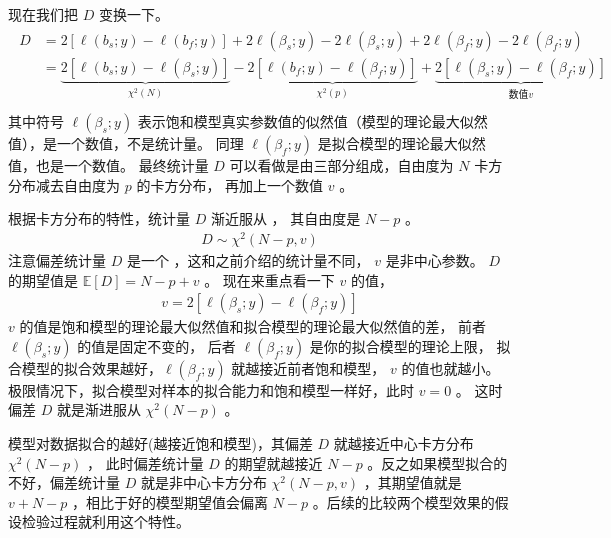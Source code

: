 \documentclass[letterpaper,10pt,english]{sphinxmanual}
\begin{document}
现在我们把 \(D\) 变换一下。
\begin{align}\label{equation:模型评估/influence:模型评估/influence:33}\!\begin{aligned}
D &= 2[\ell(b_{s};y) - \ell(b_{f};y)]
+ 2\ell(\beta_{s};y) - 2\ell(\beta_{s};y)
+ 2\ell(\beta_{f};y)  - 2\ell(\beta_{f};y)\\
&= \underbrace{2[ \ell(b_{s};y) -  \ell(\beta_{s};y)  ]}_{\chi^2(N)}
- \underbrace{2[ \ell(b_{f};y) - \ell(\beta_{f};y)  ]}_{\chi^2(p)}
+ \underbrace{2[ \ell(\beta_{s};y) - \ell(\beta_{f};y)   ]}_{\text{数值}v}\\
\end{aligned}\end{align}
其中符号 \(\ell(\beta_{s};y)\) 表示饱和模型真实参数值的似然值（模型的理论最大似然值），是一个数值，不是统计量。
同理 \(\ell(\beta_{f};y)\) 是拟合模型的理论最大似然值，也是一个数值。
最终统计量 \(D\) 可以看做是由三部分组成，自由度为 \(N\) 卡方分布减去自由度为 \(p\) 的卡方分布，
再加上一个数值 \(v\) 。

根据卡方分布的特性，统计量 \(D\) 渐近服从  ，
其自由度是 \(N-p\) 。
\begin{equation}\label{equation:模型评估/influence:模型评估/influence:34}
\begin{split}D \sim \chi^2(N-p,v)\end{split}
\end{equation}
注意偏差统计量 \(D\) 是一个 ，这和之前介绍的统计量不同，
\(v\) 是非中心参数。
\(D\) 的期望值是 \(\mathbb{E}[D] = N-p+v\) 。
现在来重点看一下 \(v\) 的值，
\begin{equation}\label{equation:模型评估/influence:模型评估/influence:35}
\begin{split}v = 2[ \ell(\beta_{s};y) - \ell(\beta_{f};y)   ]\end{split}
\end{equation}
\(v\) 的值是饱和模型的理论最大似然值和拟合模型的理论最大似然值的差，
前者 \(\ell(\beta_{s};y)\) 的值是固定不变的，
后者 \(\ell(\beta_{f};y)\) 是你的拟合模型的理论上限，
拟合模型的拟合效果越好，\(\ell(\beta_{f};y)\) 就越接近前者饱和模型，
\(v\) 的值也就越小。
极限情况下，拟合模型对样本的拟合能力和饱和模型一样好，此时 \(v=0\) 。
这时偏差 \(D\) 就是渐进服从  \(\chi^2(N-p)\) 。

\begin{sphinxShadowBox}

模型对数据拟合的越好(越接近饱和模型)，其偏差 \(D\) 就越接近中心卡方分布 \(\chi^2(N-p)\) ，
此时偏差统计量 \(D\) 的期望就越接近 \(N-p\) 。反之如果模型拟合的不好，偏差统计量 \(D\)
就是非中心卡方分布 \(\chi^2(N-p,v)\) ，其期望值就是 \(v+N-p\) ，相比于好的模型期望值会偏离 \(N-p\)
。后续的比较两个模型效果的假设检验过程就利用这个特性。
\end{sphinxShadowBox}
\end{document}

